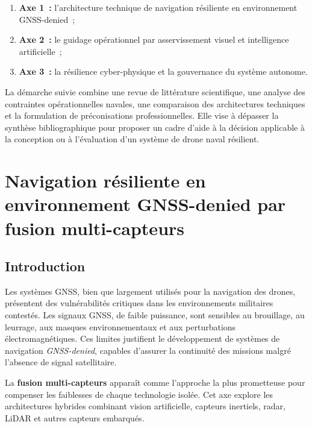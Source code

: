 \documentclass[12pt, a4paper, twoside, openright]{report}
\begin{document}
\begin{enumerate}
    \item \textbf{Axe 1~:} l'architecture technique de navigation résiliente en environnement GNSS-denied~;
    \item \textbf{Axe 2~:} le guidage opérationnel par asservissement visuel et intelligence artificielle~;
    \item \textbf{Axe 3~:} la résilience cyber-physique et la gouvernance du système autonome.
\end{enumerate}

La démarche suivie combine une revue de littérature scientifique, une analyse des contraintes opérationnelles navales, une comparaison des architectures techniques et la formulation de préconisations professionnelles. Elle vise à dépasser la synthèse bibliographique pour proposer un cadre d'aide à la décision applicable à la conception ou à l'évaluation d'un système de drone naval résilient.

\cleardoublepage

\chapter{Navigation résiliente en environnement GNSS-denied par fusion multi-capteurs}\label{chap:axe1}

\section{Introduction}

Les systèmes GNSS, bien que largement utilisés pour la navigation des drones, présentent des vulnérabilités critiques dans les environnements militaires contestés. Les signaux GNSS, de faible puissance, sont sensibles au brouillage, au leurrage, aux masques environnementaux et aux perturbations électromagnétiques. Ces limites justifient le développement de systèmes de navigation \textit{GNSS-denied}, capables d'assurer la continuité des missions malgré l'absence de signal satellitaire.

La \textbf{fusion multi-capteurs} apparaît comme l'approche la plus prometteuse pour compenser les faiblesses de chaque technologie isolée. Cet axe explore les architectures hybrides combinant vision artificielle, capteurs inertiels, radar, LiDAR et autres capteurs embarqués.
\end{document}
